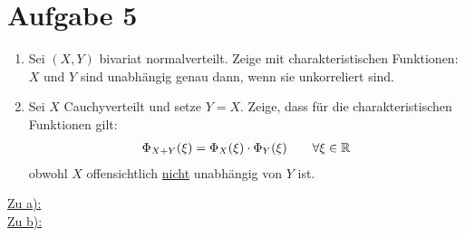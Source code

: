 \documentclass[12pt,a4paper]{article}
\begin{document}
\section*{Aufgabe 5}
\begin{enumerate}[label=\alph*)]
\item Sei $(X,Y)$ bivariat normalverteilt. Zeige mit charakteristischen Funktionen: $X$ und $Y$ sind unabhängig genau dann, wenn sie unkorreliert sind.
\item Sei $X$ Cauchyverteilt und setze $Y=X$. Zeige, dass für die charakteristischen Funktionen gilt:
\begin{align*}
\Phi_{X+Y}(\xi)=\Phi_X(\xi)\cdot\Phi_Y(\xi)\qquad\forall\xi\in\mathbb{R}
\end{align*} 
obwohl $X$ offensichtlich \ul{nicht} unabhängig von $Y$ ist.
\end{enumerate}

\begin{lösung}
\underline{Zu a):}\\
\underline{Zu b):}\\
\end{lösung}
\end{document}
